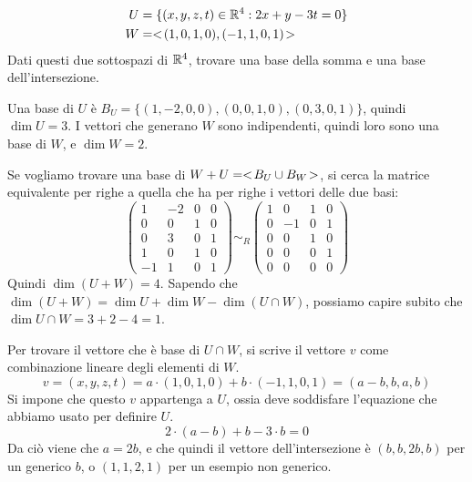 \begin{exmp}
\begin{align*}
U &= \{ (x,y,z,t) \in \mathbb{R}^4 : 2x + y - 3t = 0\} \\
W &= <\!{(1,0,1,0), (-1,1,0,1)}\!>
\end{align*}
Dati questi due sottospazi di $\mathbb{R}^4$, trovare una base della somma e una base dell'intersezione.

Una base di $U$ \`e $B_U = \{(1,-2,0,0), (0,0,1,0), (0,3,0,1)\}$, quindi $\dim U = 3$. I vettori che generano $W$ sono indipendenti, quindi loro sono una base di $W$, e $\dim W = 2$.

Se vogliamo trovare una base di $W + U = <\!{ B_U \cup B_W }\!>$, si cerca la matrice equivalente per righe a quella che ha per righe i vettori delle due basi:
\[
\begin{pmatrix}
1 & -2 & 0 & 0 \\
0 & 0 & 1 & 0 \\
0 & 3 & 0 & 1 \\
1 & 0 & 1 & 0 \\
-1 & 1 & 0 & 1
\end{pmatrix}
\sim_R
\begin{pmatrix}
1 & 0 & 1 & 0 \\
0 & -1 & 0 & 1 \\
0 & 0 & 1 & 0 \\ 
0 & 0 & 0 & 1 \\
0 & 0 & 0 & 0
\end{pmatrix}
\]
Quindi $\dim (U + W) = 4$. Sapendo che $\dim (U + W) = \dim U + \dim W - \dim (U \cap W)$, possiamo capire subito che $\dim U \cap W = 3 + 2 - 4 = 1$.

Per trovare il vettore che \`e base di $U \cap W$, si scrive il vettore $v$ come combinazione lineare degli elementi di $W$.
\[
v = (x, y, z, t) =
a \cdot (1,0,1,0) + b \cdot (-1,1,0,1) =
(a - b, b, a, b)
\]
Si impone che questo $v$ appartenga a $U$, ossia deve soddisfare l'equazione che abbiamo usato per definire $U$.
\[
2 \cdot (a - b) + b - 3 \cdot b = 0
\]
Da ci\`o viene che $a = 2b$, e che quindi il vettore dell'intersezione \`e $(b,b,2b,b)$ per un generico $b$, o $(1,1,2,1)$ per un esempio non generico.
\end{exmp}































